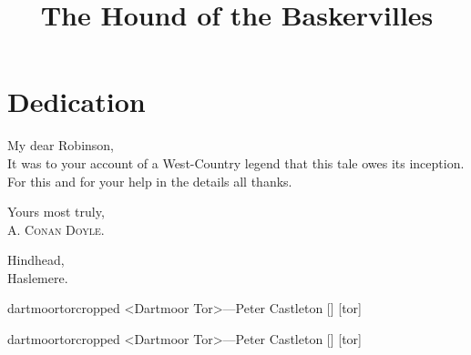\documentclass[
a5paper,
]{scrbook} %
\title{The Hound of the Baskervilles}
\begin{document}
\frontmatter
\pagestyle{plain}



\chapter*{Dedication}

My dear Robinson,\\

It was to your account of a West-Country legend that this tale owes its inception. For this and for your help in the details all thanks.

\begin{flushright}
Yours most truly,\\
\textsc{A. Conan Doyle.}
\end{flushright}

{\noindent Hindhead,\\}
    Haslemere.
  
\clearpage



\tableofcontents


\begin{letter}
	\begin{bwbigpic}
		[1.1] 
		{dartmoortorcropped}
		{<Dartmoor Tor>—Peter Castleton}
		[]
		[tor]
	\end{bwbigpic}
\end{letter}
\begin{a4}
	\begin{bwbigpic}
		[1] 
		{dartmoortorcropped}
		{<Dartmoor Tor>—Peter Castleton}
		[]
		[tor]
	\end{bwbigpic}
\end{a4}



\clearpage

\mainmatter
\pagestyle{headings}
\renewcommand*{\chapterpagestyle}{plain}
















\end{document}
